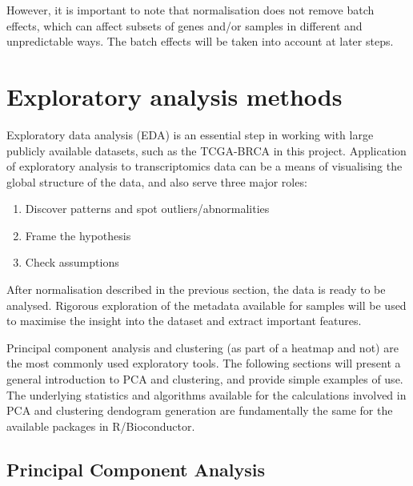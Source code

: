     However, it is important to note that normalisation does not remove batch effects, which can affect subsets of genes and/or samples in different and unpredictable ways. The batch effects will be taken into account at later steps. 

    
             
   
    
    
   
\newpage    
\section{Exploratory analysis methods}
    
    Exploratory data analysis (EDA) is an essential step in working with large publicly available datasets, such as the TCGA-BRCA in this project. Application of exploratory analysis to transcriptomics data can be a means of visualising the global structure of the data, and also serve three major roles: 
    
    \begin{enumerate}
      \item Discover patterns and spot outliers/abnormalities
      \item Frame the hypothesis
      \item Check assumptions 
    \end{enumerate}
    
    After normalisation described in the previous section, the data is ready to be analysed. Rigorous exploration of the metadata available for samples will be used to maximise the insight into the dataset and extract important features.
    
    Principal component analysis and clustering (as part of a heatmap and not) are the most commonly used exploratory tools. The following sections will present a general introduction to PCA and clustering, and provide simple examples of use. The underlying statistics and algorithms available for the calculations involved in PCA and clustering dendogram generation are fundamentally the same for the available packages in R/Bioconductor. 
    
    
    \subsection{Principal Component Analysis}
    

